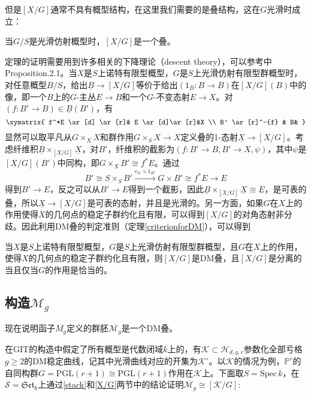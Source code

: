 但是$ [X/G] $通常不具有概型结构，在这里我们需要的是叠结构，这在$ G $光滑时成立：
\begin{theorem}
	当$ G/S $是光滑仿射概型时，$ [X/G] $是一个叠。
\end{theorem}
定理的证明需要用到许多相关的下降理论（descent theory），可以参考\cite{NotesModuliSpaceofCurves}中Proposition.2.1。当$ X $是$ S $上诺特有限型概型，$ G $是$ S $上光滑仿射有限型群概型时，对任意概型$ B/S $，给出$ \underline{B}\to [X/G] $等价于给出$ (1_B:B\to B) $在$ [X/G](B) $中的像，即一个$ B $上的$ G $-主丛$ E\to B $和一个$ G $-不变态射$ E\to X $。对$ (f:B'\to B)\in \underline{B}(B') $，有
$$ \xymatrix{
	f^*E \ar[d] \ar[r]& E \ar[d]\ar[r]&X \\
	B' \ar[r]^-{f} & B&
} $$
显然可以取平凡从$ G\times_X X $和群作用$ G\times_SX\to X $定义叠的1-态射$ \underline{X}\to [X/G] $。考虑纤维积$ \underline{B}\times_{[X/G]} \underline{X} $，对$ B' $，纤维积的截影为$ (f:B' \to B,B'\to X,\psi) $，其中$ \psi $是$ [X/G](B') $中同构，即$ G\times_X B'\cong f^*E $。通过
$$ B'\cong S\times_SB'\xrightarrow{e_G\times 1_{B'}} G\times B'\cong f^*E\to E  $$
得到$ B'\to E $，反之可以从$ B'\to E $得到一个截影，因此$ \underline{B}\times_{[X/G]} \underline{X}\cong \underline{E} $，是可表的叠，所以$ \underline{X}\to [X/G] $是可表的态射，并且是光滑的。另一方面，如果$ G $在$ X $上的作用使得$ X $的几何点的稳定子群约化且有限，可以得到$ [X/G] $的对角态射非分歧。因此利用DM叠的判定准则（定理\ref{criterionforDM}），可以得到
\begin{theorem}
	当$ X $是$ S $上诺特有限型概型，$ G $是$ S $上光滑仿射有限型群概型，且$ G $在$ X $上的作用，使得$ X $的几何点的稳定子群约化且有限，则$ [X/G] $是DM叠，且$ [X/G] $是分离的当且仅当$ G $的作用是恰当的。
\end{theorem}


\subsection{构造$ \mathscr{M}_g $}
现在说明函子$ \overline{M_g} $定义的群胚$ \overline{\mathscr{M}_g} $是一个DM叠。

在GIT的构造中假定了所有概型是代数闭域$ k $上的，有$ \mathcal{K}\subset \mathcal{H}_{d,g,r} $参数化全部亏格$ g\geqslant2 $的DM稳定曲线，记其中光滑曲线对应的开集为$ \mathcal{K}^\circ $。以$ \mathcal{K} $的情况为例，$ \mathbb{P}^r $的自同构群$G= \mathrm{PGL}(r+1)\cong \mathrm{PGL}(r+1) $作用在$ \mathcal{K} $上。下面取$ S=\mathrm{Spec}\,k $，在$ \mathscr{S}=\mathfrak{Set}_k $上通过\ref{stack}和\ref{X/G}两节中的结论证明$ \overline{\mathscr{M}_g}\cong [\mathcal{K}/G] $:

